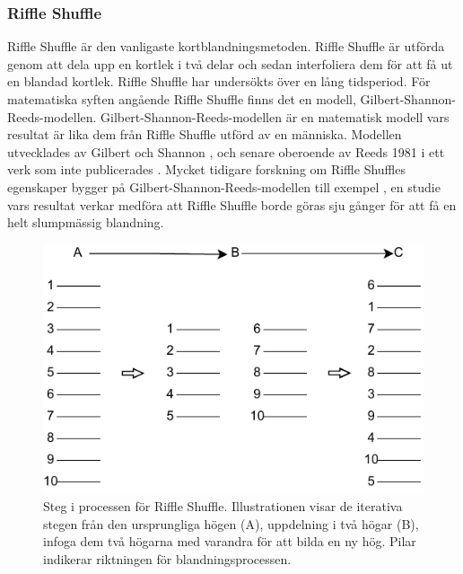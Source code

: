 \documentclass[swedish,a4paper]{article}
\begin{document}
\subsubsection{Riffle Shuffle}
\label{sec:riffle_shuffle}
Riffle Shuffle är den vanligaste kortblandningsmetoden. Riffle Shuffle är utförda genom att dela upp en kortlek i två delar och sedan interfoliera dem för att få ut en blandad kortlek.
Riffle Shuffle har undersökts över en lång tidsperiod. För matematiska syften angående Riffle Shuffle finns det en modell, Gilbert-Shannon-Reeds-modellen.  Gilbert-Shannon-Reeds-modellen är en matematisk modell vars resultat är lika dem från Riffle Shuffle utförd av en människa. Modellen utvecklades av Gilbert och Shannon \parencite{gilbertshuftheo}, och senare oberoende av Reeds 1981 i ett verk som inte publicerades \parencite[77-79]{gsr2003mathematical}.  Mycket tidigare forskning om Riffle Shuffles egenskaper bygger på Gilbert-Shannon-Reeds-modellen till exempel \textcite{dovetaillair}, en studie vars resultat verkar medföra att Riffle Shuffle borde göras sju gånger för att få en helt slumpmässig blandning. 

\begin{figure}[H]
	\begin{center}
		\includegraphics{images/rifflle-shuffle.pdf}
	\end{center}
	\captionsetup{justification=centering,margin=2cm}
	\caption{Steg i processen för Riffle Shuffle. Illustrationen visar de
	iterativa stegen från den ursprungliga högen (A), uppdelning i två
	högar (B), infoga dem två högarna med varandra för att bilda en ny hög.
        Pilar indikerar riktningen för blandningsprocessen.}
	\label{fig:riffle_shuffle_1}
\end{figure}
\end{document}
